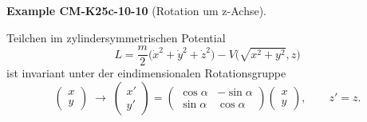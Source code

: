 \documentclass[10pt, letterpaper]{article}
\newcommand{\CustomHeading}[3]{%
  \par\medskip\noindent%
  \textbf{#1 #2} \textnormal{(#3)}.\enskip%
}
\newenvironment{EXA}[2]{\CustomHeading{Example}{#1}{#2}}{}
\begin{document}
\begin{EXA}{CM-K25c-10-10}{Rotation um z-Achse}
Teilchen im zylindersymmetrischen Potential
\[
  L=\frac{m}{2}\bigl(\dot x^{2}+\dot y^{2}+\dot z^{2}\bigr)
     -V\bigl(\sqrt{x^{2}+y^{2}},z\bigr)
\]
ist invariant unter der eindimensionalen Rotationsgruppe
\[
  \begin{pmatrix}x\\y\end{pmatrix}
  \;\longrightarrow\;
  \begin{pmatrix}
    x'\\[4pt] y'
  \end{pmatrix}
  =
  \begin{pmatrix}
    \cos\alpha & -\sin\alpha\\
    \sin\alpha &  \cos\alpha
  \end{pmatrix}
  \begin{pmatrix}x\\y\end{pmatrix},
  \qquad
  z'=z .
\]
\end{EXA}
\end{document}
